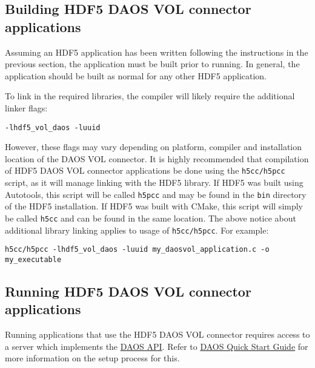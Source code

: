 \documentclass[12pt]{THG_Guide}
\begin{document}
\newpage

\subsection{Building HDF5 DAOS VOL connector applications}

Assuming an HDF5 application has been written following the instructions in the previous section, the application must be built prior to running. In general, the application should be built as normal for any other HDF5 application.

To link in the required libraries, the compiler will likely require the additional linker flags:

\begin{verbatim}
-lhdf5_vol_daos -luuid
\end{verbatim}

However, these flags may vary depending on platform, compiler and installation location of the DAOS VOL connector. It is highly recommended that compilation of HDF5 DAOS VOL connector applications be done using the \texttt{h5cc/h5pcc} script, as it will manage linking with the HDF5 library. If HDF5 was built using Autotools, this script will be called \texttt{h5pcc} and may be found in the \texttt{bin} directory of the HDF5 installation. If HDF5 was built with CMake, this script will simply be called \texttt{h5cc} and can be found in the same location. The above notice about additional library linking applies to usage of \texttt{h5cc/h5pcc}. For example:

\begin{verbatim}
h5cc/h5pcc -lhdf5_vol_daos -luuid my_daosvol_application.c -o my_executable
\end{verbatim}

\newpage

\subsection{Running HDF5 DAOS VOL connector applications}

Running applications that use the HDF5 DAOS VOL connector requires access to a server which implements the \href{https://github.com/daos-stack/daos/blob/master/src/include/daos_api.h}{DAOS API}. Refer to \href{https://github.com/daos-stack/daos/blob/master/doc/quickstart.md}{DAOS Quick Start Guide} for more information on the setup process for this.

\end{document}
